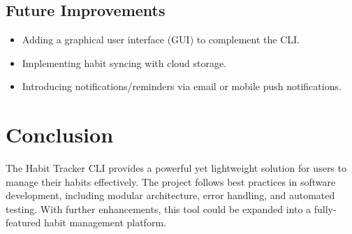 \documentclass[a4paper,12pt]{article}
\begin{document}
\subsection{Future Improvements}
\begin{itemize}
    \item Adding a graphical user interface (GUI) to complement the CLI.
    \item Implementing habit syncing with cloud storage.
    \item Introducing notifications/reminders via email or mobile push notifications.
\end{itemize}

\section{Conclusion}
The Habit Tracker CLI provides a powerful yet lightweight solution for users to manage their habits effectively. The project follows best practices in software development, including modular architecture, error handling, and automated testing. With further enhancements, this tool could be expanded into a fully-featured habit management platform.
\end{document}
